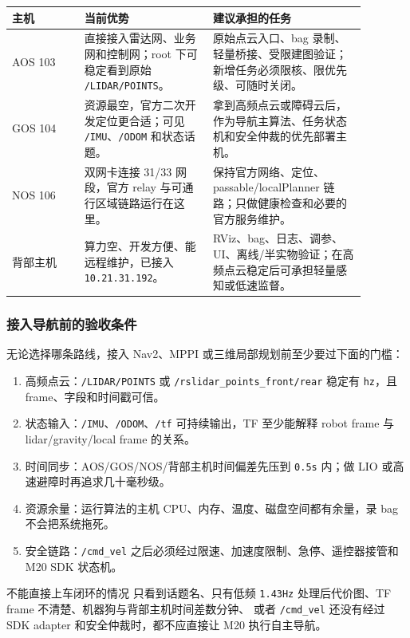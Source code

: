 \documentclass[UTF8,11pt,a4paper]{ctexart}
\begin{document}
\begin{center}
\renewcommand{\arraystretch}{1.22}
\begin{tabular}{p{0.18\linewidth}p{0.32\linewidth}p{0.38\linewidth}}
\toprule
\textbf{主机} & \textbf{当前优势} & \textbf{建议承担的任务}\\
\midrule
AOS 103 &
直接接入雷达网、业务网和控制网；root 下可稳定看到原始 \texttt{/LIDAR/POINTS}。 &
原始点云入口、bag 录制、轻量桥接、受限建图验证；新增任务必须限核、限优先级、可随时关闭。\\
GOS 104 &
资源最空，官方二次开发定位更合适；可见 \texttt{/IMU}、\texttt{/ODOM} 和状态话题。 &
拿到高频点云或障碍云后，作为导航主算法、任务状态机和安全仲裁的优先部署主机。\\
NOS 106 &
双网卡连接 31/33 网段，官方 relay 与可通行区域链路运行在这里。 &
保持官方网络、定位、passable/localPlanner 链路；只做健康检查和必要的官方服务维护。\\
背部主机 &
算力空、开发方便、能远程维护，已接入 \texttt{10.21.31.192}。 &
RViz、bag、日志、调参、UI、离线/半实物验证；在高频点云稳定后可承担轻量感知或低速监督。\\
\bottomrule
\end{tabular}
\end{center}

\subsubsection{接入导航前的验收条件}

无论选择哪条路线，接入 Nav2、MPPI 或三维局部规划前至少要过下面的门槛：

\begin{enumerate}
  \item 高频点云：\texttt{/LIDAR/POINTS} 或 \texttt{/rslidar\_points\_front/rear} 稳定有 \texttt{hz}，且 frame、字段和时间戳可信。
  \item 状态输入：\texttt{/IMU}、\texttt{/ODOM}、\texttt{/tf} 可持续输出，TF 至少能解释 robot frame 与 lidar/gravity/local frame 的关系。
  \item 时间同步：AOS/GOS/NOS/背部主机时间偏差先压到 \texttt{0.5s} 内；做 LIO 或高速避障时再追求几十毫秒级。
  \item 资源余量：运行算法的主机 CPU、内存、温度、磁盘空间都有余量，录 bag 不会把系统拖死。
  \item 安全链路：\texttt{/cmd\_vel} 之后必须经过限速、加速度限制、急停、遥控器接管和 M20 SDK 状态机。
\end{enumerate}

\begin{redbox}{不能直接上车闭环的情况}
只看到话题名、只有低频 \texttt{1.43Hz} 处理后代价图、TF frame 不清楚、机器狗与背部主机时间差数分钟、
或者 \texttt{/cmd\_vel} 还没有经过 SDK adapter 和安全仲裁时，都不应直接让 M20 执行自主导航。
\end{redbox}
\end{document}
